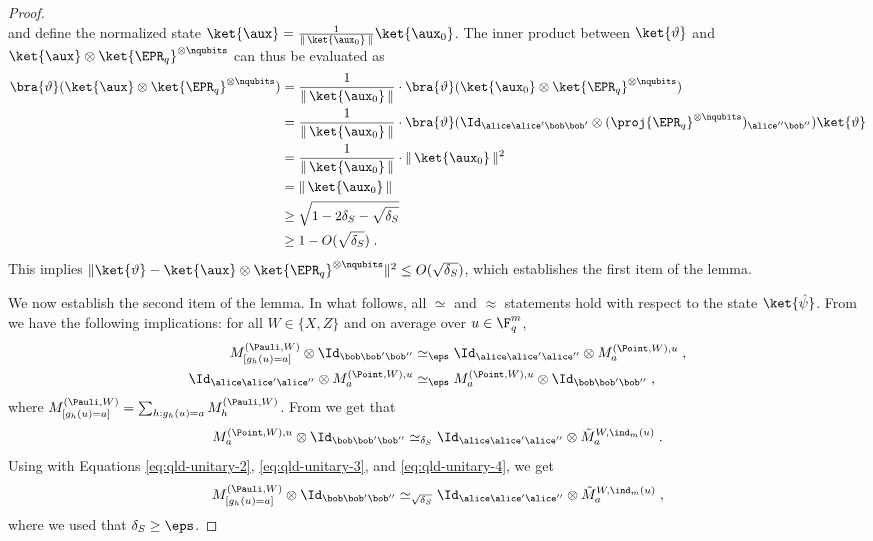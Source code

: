 \begin{proof}
\[\]
and define the normalized state $\ket{\aux} = \frac{1}{\| \, \ket{\aux_0} \, \|} \ket{\aux_0}$. 
The inner product between $\ket{\vartheta}$ and $\ket{\aux} \otimes \ket{\EPR_q}^{\otimes \nqubits}$ can thus be evaluated as
\begin{align*}
	\bra{\vartheta} (\ket{\aux} \otimes \ket{\EPR_q}^{\otimes \nqubits}) &= \frac{1}{\| \, \ket{\aux_0} \, \|} \cdot \bra{\vartheta} (\ket{\aux_0} \otimes \ket{\EPR_q}^{\otimes \nqubits}) \\
	&= \frac{1}{\| \, \ket{\aux_0} \, \|} \cdot \bra{\vartheta} (\Id_{\alice \alice' \bob \bob'} \otimes (\proj{\EPR_q}^{\otimes \nqubits})_{\alice'' \bob''}) \ket{\vartheta} \\
	&= \frac{1}{\| \, \ket{\aux_0} \, \|} \cdot \| \, \ket{\aux_0} \, \|^2 \\
	&= \| \, \ket{\aux_0} \, \| \\
	&\geq \sqrt{1 - 2\delta_S - \sqrt{\delta_S}} \\
	&\geq 1 - O(\sqrt{\delta_S})\;.
\end{align*}
This implies $\| \ket{\vartheta} - \ket{\aux} \otimes \ket{\EPR_q}^{\otimes \nqubits} \|^2 \leq O(\sqrt{\delta_S})$, which establishes the first item of the lemma.

We now establish the second item of the lemma. In what follows, all $\simeq$ and $\approx$ statements hold with respect to the state $\ket{\hat{\psi}}$. From  we have the following implications: for all $W \in \{X,Z\}$ and on average over $u \in \F_q^m$,
	\begin{align}
	\label{eq:qld-unitary-2}
	M^{(\Pauli,W)}_{[g_h(u)=a]} \otimes \Id_{\bob \bob' \bob''} &\simeq_\eps \Id_{\alice \alice' \alice''} \otimes M^{(\Point,W),u}_a\;, \\
	\label{eq:qld-unitary-3}
	\Id_{\alice \alice' \alice''} \otimes M^{(\Point,W),u}_a &\simeq_\eps  M^{(\Point,W),u}_a \otimes \Id_{\bob \bob' \bob''}\;,
	\end{align}
	where $M^{(\Pauli,W)}_{[g_h(u)=a]} = \sum_{h : g_h(u) = a} M^{(\Pauli,W)}_h$. 
From  we get that
	\begin{equation}
	\label{eq:qld-unitary-4}
		M^{(\Point,W),u}_a \otimes \Id_{\bob \bob' \bob''} \simeq_{\delta_S} \Id_{\alice \alice' \alice''}  \otimes \tilde{M}^{W,\ind_m(u)}_a\;.
	\end{equation}
Using  with Equations \eqref{eq:qld-unitary-2}, \eqref{eq:qld-unitary-3}, and \eqref{eq:qld-unitary-4}, we get 
	\begin{equation}
		\label{eq:qld-unitary-5}
		M^{(\Pauli,W)}_{[g_h(u)=a]} \otimes \Id_{\bob \bob' \bob''} \simeq_{\sqrt{\delta_S}} \Id_{\alice \alice' \alice''}  \otimes \tilde{M}^{W,\ind_m(u)}_a\;,
	\end{equation}
	where we used that $\delta_S \geq \eps$. 
	

\end{proof}
